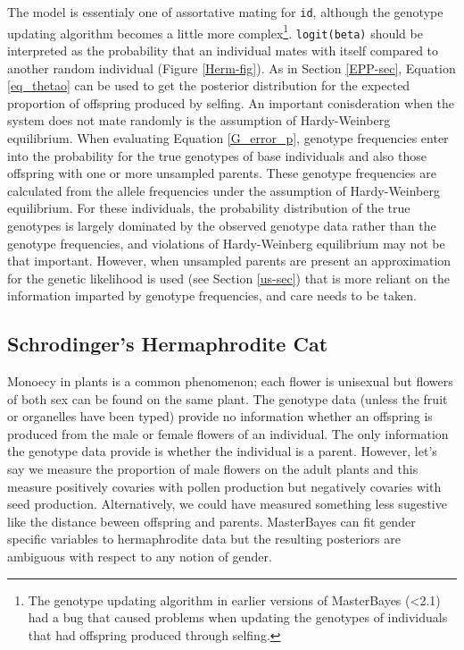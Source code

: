 \documentclass{article}
\begin{document}
The model is essentialy one of assortative mating for \texttt{id}, although the genotype updating algorithm becomes a little more complex\footnote{The genotype updating algorithm in earlier versions of MasterBayes (<2.1) had a bug that caused problems when updating the genotypes of individuals that had offspring produced through selfing.}.  \texttt{logit(beta)} should be interpreted as the probability that an individual mates with itself compared to another random individual (Figure \ref{Herm-fig}).  As in Section \ref{EPP-sec}, Equation \ref{eq_thetao} can be used to get the posterior distribution for the expected proportion of offspring produced by selfing.  An important conisderation when the system does not mate randomly is the assumption of Hardy-Weinberg equilibrium.  When evaluating Equation \ref{G_error_p}, genotype frequencies enter into the probability for the true genotypes of base individuals and also those offspring with one or more unsampled parents. These genotype frequencies are calculated from the allele frequencies under the assumption of Hardy-Weinberg equilibrium. For these individuals, the probability distribution of the true genotypes is largely dominated by the observed genotype data rather than the genotype frequencies, and violations of Hardy-Weinberg equilibrium may not be that important.  However, when unsampled parents are present an approximation for the genetic likelihood is used (see Section \ref{us-sec}) that is more reliant on the information imparted by genotype frequencies, and care needs to be taken. 

\subsection{Schrodinger's Hermaphrodite Cat}
\label{SHC}

Monoecy in plants is a common phenomenon; each flower is unisexual but flowers of both sex can be found on the same plant.  The genotype data (unless the fruit or organelles have been typed) provide no information whether an offspring is produced from the male or female flowers of an individual. The only information the genotype data provide is whether the individual is a parent.  However, let's say we measure the proportion of male flowers on the adult plants and this measure positively covaries with pollen production but negatively covaries with seed production.  Alternatively, we could have measured something less sugestive like the distance beween offspring and parents.  MasterBayes can fit gender specific variables to hermaphrodite data but the resulting posteriors are ambiguous with respect to any notion of gender.\\
\end{document}
